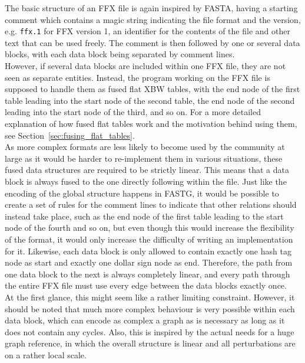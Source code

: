 \documentclass[a4paper,12pt,twoside,BCOR=10mm]{scrbook}
\begin{document}
The basic structure of an FFX file is again inspired by FASTA,
having a starting comment which contains a magic string indicating the
file format and the version, e.g. \texttt{ffx.1} for FFX version 1, an identifier for
the contents of the file and other text that can be used freely.
The comment is then followed by one or several data blocks,
with each data block being separated by comment lines. \\
However, if several data blocks are included within one FFX file,
they are not seen as separate entities. Instead, the program working on
the FFX file is supposed to handle them as fused flat XBW tables,
with the end node of the first table leading into the start node of the
second table, the end node of the second leading into the start node of the
third, and so on.
For a more detailed explanation of how fused
flat tables work and the motivation behind using them,
see Section~\ref{sec:fusing_flat_tables}. \\
As more complex formats are less likely to become
used by the community at large as it would be harder to re-implement them
in various situations, these fused data structures are required to be strictly linear.
This means that a data block is always fused to the one directly following
within the file.
Just like the encoding of the global structure happens in FASTG,
it would be possible to create a set of rules for the comment
lines to indicate that other relations should instead take place, such as the
end node of the first table leading to the start node of the fourth and so on,
but even though this would increase the flexibility of the format, it would only
increase the difficulty of writing an implementation for it.
Likewise, each data block is only allowed to contain exactly one hash tag node
as start and exactly one dollar sign node as end. Therefore, the path from one
data block to the next is always completely linear, and every path through the
entire FFX file must use every edge between the data blocks exactly once. \\
At the first glance, this might seem like a rather limiting constraint.
However, it should be noted that much more complex behaviour is very possible
within each data block, which can encode as complex a graph as is necessary
as long as it does not contain any cycles.
Also, this is inspired by the actual needs for a huge graph reference,
in which the overall structure is linear and all perturbations are on a
rather local scale.

\pagebreak
\end{document}
